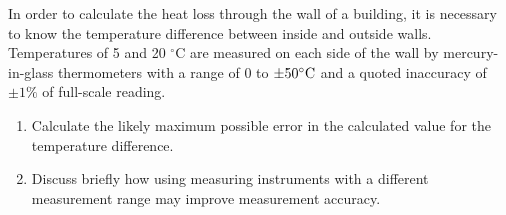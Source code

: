 \documentclass[a4paper,11pt,dvipsnames]{book}
\begin{document}
\begin{question}
In order to calculate the heat loss through the wall of a building, it is necessary to know the temperature difference between inside and outside walls. Temperatures of 5 and 20 $^{\circ}$C are measured on each side of the wall by mercury-in-glass thermometers with a range of 0 to $\rm \pm 50^{\circ}C$ and a quoted inaccuracy of $\pm 1\%$ of full-scale reading.
\begin{enumerate}
\item Calculate the likely maximum possible error in the calculated value for the temperature difference.
\item Discuss briefly how using measuring instruments with a different measurement range may improve measurement accuracy.
\end{enumerate}
\examspace*{10em}

\end{question}
\begin{solution}


\end{solution}
\end{document}
